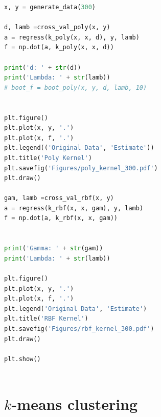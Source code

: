 \documentclass{article}
\newcommand{\1}{\mathbf{1}}
\begin{document}
\begin{lstlisting}[language=Python]
x, y = generate_data(300)

d, lamb =cross_val_poly(x, y)
a = regress(k_poly(x, x, d), y, lamb)
f = np.dot(a, k_poly(x, x, d))

print('d: ' + str(d))
print('Lambda: ' + str(lamb))
# boot_f = boot_poly(x, y, d, lamb, 10)


plt.figure()
plt.plot(x, y, '.')
plt.plot(x, f, '.')
plt.legend(('Original Data', 'Estimate'))
plt.title('Poly Kernel')
plt.savefig('Figures/poly_kernel_300.pdf')
plt.draw()

gam, lamb =cross_val_rbf(x, y)
a = regress(k_rbf(x, x, gam), y, lamb)
f = np.dot(a, k_rbf(x, x, gam))


print('Gamma: ' + str(gam))
print('Lambda: ' + str(lamb))

plt.figure()
plt.plot(x, y, '.')
plt.plot(x, f, '.')
plt.legend('Original Data', 'Estimate')
plt.title('RBF Kernel')
plt.savefig('Figures/rbf_kernel_300.pdf')
plt.draw()

plt.show()



\end{lstlisting}

\section{$k$-means clustering}
\end{document}
